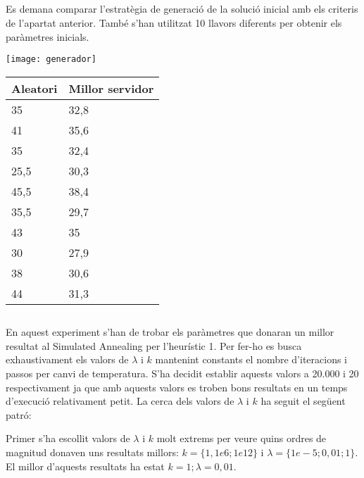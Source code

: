 \documentclass[a4paper, 12pt]{article}
\begin{document}
\newpage
\subsection{}
Es demana comparar l'estratègia de generació de la solució inicial amb els criteris de l'apartat anterior. També s'han utilitzat 10
llavors diferents per obtenir els paràmetres inicials. 

\begin{minipage}{\textwidth}
\centering
\begin{minipage}[b]{0.55\linewidth}
\texttt{[image: generador]}
\end{minipage}
\hfill
\begin{minipage}[b]{0.34\linewidth}
	\centering
	\begin{tabular}{l || l}
		Aleatori & Millor servidor \\
		\hline
		35 & 32,8 \\
		41 & 35,6 \\
		35 & 32,4 \\
		25,5 & 30,3 \\
		45,5 & 38,4 \\
		35,5 & 29,7 \\
		43 & 35 \\
		30 & 27,9 \\
		38 & 30,6 \\ 
		44 & 31,3 \\
	\end{tabular}
\end{minipage}
\end{minipage}

\newpage
\subsection{}
En aquest experiment s'han de trobar els paràmetres que donaran un millor resultat al Simulated Annealing
per l'heurístic 1. Per fer-ho es busca exhaustivament els valors de $\lambda$ i $k$ mantenint constants el
nombre d'iteracions i passos per canvi de temperatura. S'ha decidit establir aquests valors a 20.000 i 20 
respectivament ja que amb aquests valors es troben bons resultats en un temps d'execució
relativament petit. La cerca dels valors de $\lambda$ i $k$ ha seguit el següent patró:

Primer s'ha escollit valors de $\lambda$ i $k$ molt extrems per veure quins ordres de magnitud donaven uns
resultats millors: $k=\{1,1e6; 1e12\}$ i $\lambda=\{1e-5; 0,01; 1\}$. El millor d'aquests resultats ha estat
${ k = 1; \lambda = 0,01 }$.
\end{document}
